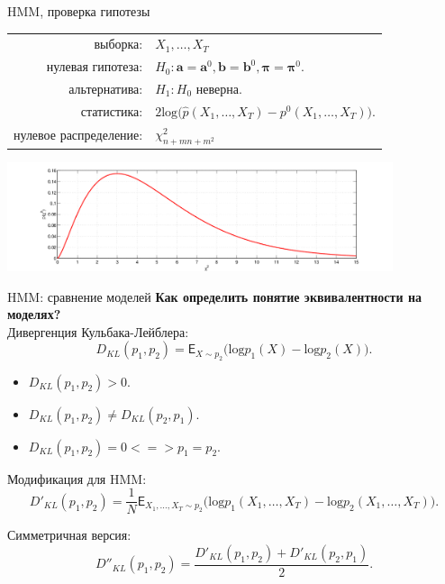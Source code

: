 \begin{frame}{HMM, проверка гипотезы}
\begin{center}
\begin{tabular}{rl}
            выборка:                        & $X_1, \dots, X_T$ \\
            нулевая гипотеза:               & $H_0\colon \mathbf{a} = \mathbf{a}^0, \mathbf{b} = \mathbf{b}^0, \boldsymbol{\pi} = \boldsymbol{\pi}^0.$ \\
            альтернатива:                   & $H_1\colon H_0$ неверна.  \\
            статистика:                     & $2\text{log}\bigl(\hat{p}(X_1,\dots,X_T) - {p}^0(X_1,\dots,X_T)\bigr).$ \\
            нулевое распределение:          & $\chi^2_{n+mn+m^2}$\\
		\end{tabular}
		\includegraphics[width=0.85\textwidth]{chi2.png}   
    \end{center}
\end{frame}

\begin{frame}{HMM: сравнение моделей}
\textbf{Как определить понятие эквивалентности на моделях?}\\
Дивергенция Кульбака-Лейблера:
\[
    D_{KL}(p_1,p_2) = \mathsf{E}_{{X} \sim p_2} \bigl(\text{log}p_1({X}) -\text{log}p_2({X})\bigr).
\]
\begin{itemize}
\item $D_{KL}(p_1,p_2)>0.$
\item $D_{KL}(p_1,p_2) \neq D_{KL}(p_2,p_1).$
\item $D_{KL}(p_1,p_2) = 0 <=> p_1 = p_2$.
\end{itemize}

Модификация для HMM:
\[
    D'_{KL}(p_1,p_2) = \frac{1}{N}\mathsf{E}_{{X}_1,\dots,{X}_T \sim p_2} \bigl(\text{log}p_1({X}_1,\dots,{X}_T) -\text{log}p_2({X}_1,\dots,{X}_T)\bigr).
\]

Симметричная версия:
\[
    D''_{KL}(p_1,p_2)  = \frac{    D'_{KL}(p_1,p_2)+     D'_{KL}(p_2,p_1)}{2}. 
\]


\end{frame}

